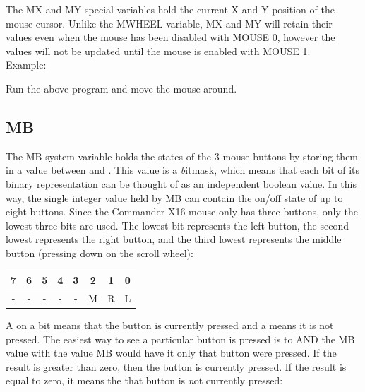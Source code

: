 The {\ttfamily MX} and {\ttfamily MY} special variables hold the current X and
Y position of the mouse cursor.  Unlike the {\ttfamily MWHEEL} variable,
{\ttfamily MX} and {\ttfamily MY} will retain their values even when the mouse
has been disabled with {\ttfamily MOUSE 0}, however the values will not be
updated until the mouse is enabled with {\ttfamily MOUSE 1}.\\

Example:\\


Run the above program and move the mouse around.\\

\subsection{MB}

The {\ttfamily MB} system variable holds the states of the 3 mouse buttons by
storing them in a value between {} and {}.  This value is
a {\emph bitmask}, which means that each bit of its binary representation can
be thought of as an independent boolean value.  In this way, the single integer
value held by {\ttfamily MB} can contain the on/off state of up to eight
buttons.  Since the Commander X16 mouse only has three buttons, only the lowest
three bits are used.  The lowest bit represents the left button, the second
lowest represents the right button, and the third lowest represents the middle
button (pressing down on the scroll wheel):\\

\begin{tabular}{|c|c|c|c|c|c|c|c|}
	\hline

	{\bfseries 7} &{\bfseries 6} &{\bfseries 5} &{\bfseries 4} &{\bfseries 3}
	&{\bfseries 2} &{\bfseries 1} &{\bfseries 0}\\ \hline

	- & - & - & - & - & M & R & L \\ \hline
	
\end{tabular}

\vspace{16pt}

A {} on a bit means that the button is currently pressed and a
{} means it is not pressed.  The easiest way to see a particular
button is pressed is to {\ttfamily AND} the {\ttfamily MB} value with the value
{\ttfamily MB} would have it only that button were pressed.  If the result is
greater than zero, then the button is currently pressed.  If the result is
equal to zero, it means the that button is {\emph not} currently pressed:\\

